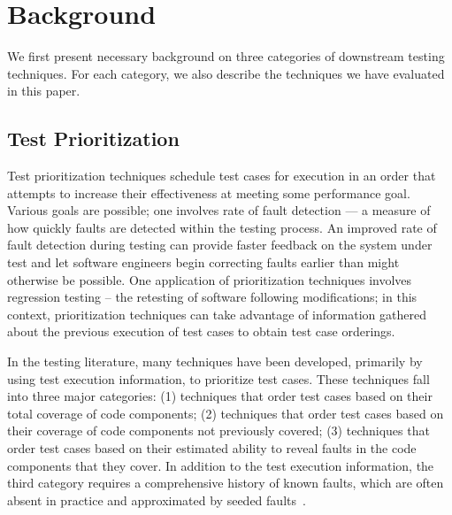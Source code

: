 \section{Background}
\label{sec:background}
We first present necessary background on three
categories of downstream testing techniques.
For each category, we also describe the techniques
we have evaluated in this paper.


\subsection{Test Prioritization}
\label{sec:backgroundprio}

Test prioritization techniques schedule test cases
for execution in an order that attempts to
increase their effectiveness at meeting some performance goal.
Various goals are possible; one involves
rate of fault detection --- a measure of how quickly
faults are detected within the testing process. An
improved rate of fault detection during testing can
provide faster feedback on the system under test and
let software engineers begin correcting faults earlier
than might otherwise be possible. One application
of prioritization techniques involves regression testing --
the retesting of software following modifications;
in this context, prioritization techniques can take advantage of information gathered about the previous
execution of test cases to obtain test case orderings.

In the testing literature, many
techniques have been developed, primarily by using test execution
information, to prioritize test cases. These techniques
fall into three major categories: (1) techniques
that order test cases based on their total coverage of
code components; (2) techniques that order test
cases based on their coverage of code components
not previously covered; (3) techniques that order test
cases based on their estimated ability to reveal faults
in the code components that they cover. In addition to the
test execution information, the third
category requires a comprehensive history of known
faults, which are often absent in practice and
approximated by seeded faults~\cite{}.


